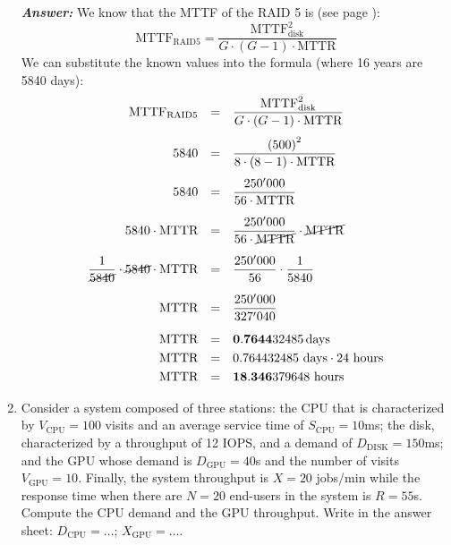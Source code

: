 \begin{enumerate}
    \textcolor{Green3}{\textbf{\emph{Answer:}}} We know that the MTTF of the RAID 5 is (see page \pageref{eq: RAID 5 - MTTF}):
    \begin{equation*}
        \text{MTTF}_{\text{RAID5}} = \dfrac{
            \text{MTTF}_\text{disk}^{2}
        }{
            G \cdot \left(G-1\right) \cdot \text{MTTR}
        }
    \end{equation*}
    We can substitute the known values into the formula (where 16 years are 5840 days):
    \begin{equation*}
        \begin{array}{rcl}
            \text{MTTF}_{\text{RAID5}} &=& \dfrac{
                \text{MTTF}_\text{disk}^{2}
            }{
                G \cdot \left(G-1\right) \cdot \text{MTTR}
            } \\ [1.3em]
            5840 &=& \dfrac{
                \left(500\right)^{2}
            }{
                8 \cdot \left(8-1\right) \cdot \text{MTTR}
            } \\ [1.3em]
            5840 &=& \dfrac{
                250'000
            }{
                56 \cdot \text{MTTR}
            } \\ [1.3em]
            5840 \cdot \text{MTTR} &=& \dfrac{
                250'000
            }{
                56 \cdot \cancel{\text{MTTR}}
            } \cdot \cancel{\text{MTTR}} \\ [1.3em]
            \dfrac{1}{\cancel{5840}} \cdot \cancel{5840} \cdot \text{MTTR} &=& \dfrac{250'000}{56} \cdot \dfrac{1}{5840} \\ [1.3em]
            \text{MTTR} &=& \dfrac{250'000}{327'040} \\ [1.3em]
            \text{MTTR} &=& \mathbf{0.7644}32485 \, \text{days} \\ [.3em]
            \text{MTTR} &=& 0.764432485 \text{ days} \cdot 24 \text{ hours} \\ [.3em]
            \text{MTTR} &=& \mathbf{18.346}379648 \text{ hours}
        \end{array}
    \end{equation*}

    \newpage

    \item Consider a system composed of three stations: the CPU that is characterized by $V_{\text{CPU}} = 100$ visits and an average service time of $S_{\text{CPU}} =10$ms; the disk, characterized by a throughput of 12 IOPS, and a demand of $D_{\text{DISK}} =150$ms; and the GPU whose demand is $D_\text{GPU} = 40$s and the number of visits $V_{\text{GPU}} =10$. Finally, the system throughput is $X=20$ jobs/min while the response time when there are $N = 20$ end-users in the system is $R = 55$s. Compute the CPU demand and the GPU throughput. Write in the answer sheet: $D_\text{CPU} = \dots$; $X_\text{GPU} = \dots$.
    

\end{enumerate}
